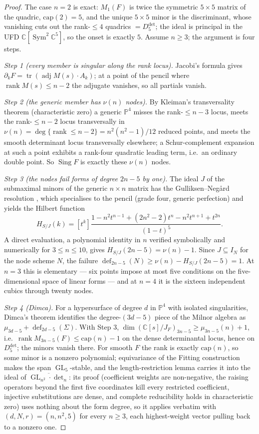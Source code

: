 \documentclass[11pt]{amsart}
\theoremstyle{plain}
\theoremstyle{definition}
\theoremstyle{remark}
\DeclareMathOperator{\GL}{GL}
\DeclareMathOperator{\Sym}{Sym}
\DeclareMathOperator{\dfc}{def}
\DeclareMathOperator{\rank}{rank}
\DeclareMathOperator{\adj}{adj}
\newcommand{\bC}{\mathbb{C}}
\newcommand{\bP}{\mathbb{P}}
\newcommand{\Ddet}{D^{\det}}
\begin{document}
\begin{proof}[Proof]
The case $n=2$ is exact: $M_1(F)$ is twice the symmetric $5\times5$ matrix of
the quadric, $\mathrm{cap}(2)=5$, and the unique $5\times5$ minor is the
discriminant, whose vanishing cuts out the rank-$\le4$ quadrics $=\Ddet_5$; the
ideal is principal in the UFD $\bC[\Sym^{2}\bC^{5}]$, so the onset is exactly
$5$.  Assume $n\ge3$; the argument is four steps.

\emph{Step 1 (every member is singular along the rank locus).} Jacobi's formula
gives $\partial_kF=\operatorname{tr}(\adj M(s)\cdot A_k)$; at a point of the
pencil where $\rank M(s)\le n-2$ the adjugate vanishes, so all partials vanish.

\emph{Step 2 (the generic member has $\nu(n)$ nodes).} By Kleiman's
transversality theorem \cite{Kleiman} (characteristic zero) a generic
$\bP^{4}$ misses the rank-$\le n-3$ locus, meets the rank-$\le n-2$ locus
transversally in $\nu(n)=\deg\{\rank\le n-2\}=n^{2}(n^{2}-1)/12$ reduced
points, and meets the smooth determinant locus transversally elsewhere; a
Schur-complement expansion at such a point exhibits a rank-four quadratic
leading term, i.e.\ an ordinary double point.  So $\operatorname{Sing}F$ is
exactly these $\nu(n)$ nodes.

\emph{Step 3 (the nodes fail forms of degree $2n-5$ by one).} The ideal $J$ of
the submaximal minors of the generic $n\times n$ matrix has the
Gulliksen--Neg\aa rd resolution \cite{GN,BrunsVetter}, which specialises to the
pencil (grade four, generic perfection) and yields the Hilbert function
\[
  H_{S/J}(k)=[t^k]\frac{1-n^{2}t^{n-1}+(2n^{2}-2)t^{n}-n^{2}t^{n+1}+t^{2n}}{(1-t)^{5}}.
\]
A direct evaluation, a polynomial identity in $n$ verified symbolically and
numerically for $3\le n\le10$, gives $H_{S/J}(2n-5)=\nu(n)-1$.  Since
$J\subseteq I_N$ for the node scheme $N$, the failure
$\dfc_{2n-5}(N)\ge\nu(n)-H_{S/J}(2n-5)=1$.  At $n=3$ this is elementary --- six
points impose at most five conditions on the five-dimensional space of linear
forms --- and at $n=4$ it is the sixteen independent cubics through twenty
nodes.

\emph{Step 4 (Dimca).} For a hypersurface of degree $d$ in $\bP^{4}$ with
isolated singularities, Dimca's theorem \cite[Thm.~3.1]{Dimca13} identifies the
degree-$(3d-5)$ piece of the Milnor algebra as $\mu_{3d-5}+\dfc_{2d-5}(\Sigma)$.
With Step 3, $\dim(\bC[s]/J_F)_{3n-5}\ge\mu_{3n-5}(n)+1$, i.e.\
$\rank M_{3n-5}(F)\le\mathrm{cap}(n)-1$ on the dense determinantal locus, hence
on $\Ddet_5$; the minors vanish there.  For smooth $F$ the rank is exactly
$\mathrm{cap}(n)$, so some minor is a nonzero polynomial; equivariance of the
Fitting construction makes the span $\GL_5$-stable, and the length-restriction
lemma carries it into the ideal of $\overline{\GL_{n^{2}}\cdot\det_n}$: its proof
(coefficient weights are non-negative, the raising operators beyond the first
five coordinates kill every restricted coefficient, injective substitutions are
dense, and complete reducibility holds in characteristic zero) uses nothing about
the form degree, so it applies verbatim with $(d,N,r)=(n,n^{2},5)$ for every
$n\ge3$, each highest-weight vector pulling back to a nonzero one.
\end{proof}
\end{document}
